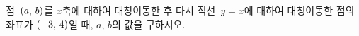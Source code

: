 점~$(a,\mkern3mu b)$를 $x$축에 대하여 대칭이동한 후 다시 직선~$y=x$에 대하여 대칭이동한 점의 좌표가 $(-3,\mkern3mu 4)$일 때, $a$, $b$의 값을 구하시오.
